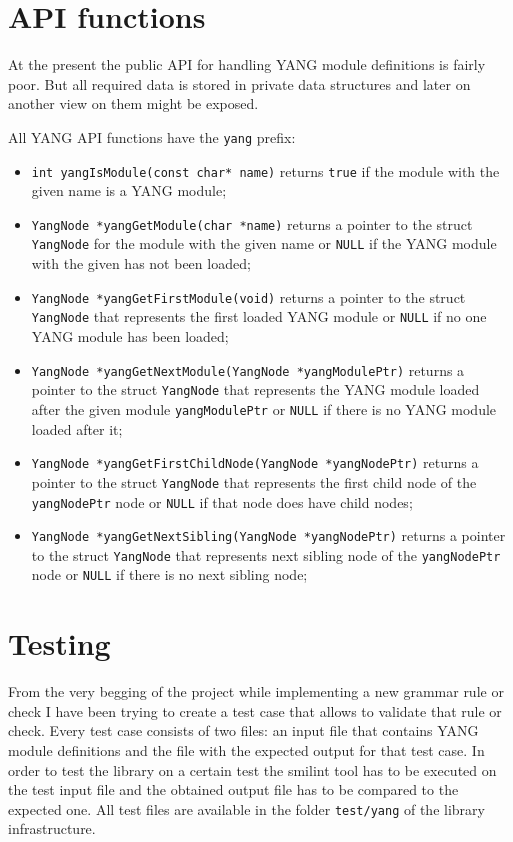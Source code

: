 \documentclass[conference]{IEEEtran}
\begin{document}
\section{API functions}
At the present the public API for handling YANG module definitions is fairly poor. But all required data is stored in private data structures and later on another view on them might be exposed.

All YANG API functions have the \texttt{yang} prefix:
\begin{itemize}
\item \texttt{int yangIsModule(const char* name)} returns \texttt{true} if the module with the given name is a YANG module;
\item \texttt{YangNode *yangGetModule(char *name)} returns a pointer to the struct \texttt{YangNode} for the module with the given name or \texttt{NULL} if the YANG module with the given has not been loaded;
\item \texttt{YangNode *yangGetFirstModule(void)} returns a pointer to the struct \texttt{YangNode} that represents the first loaded YANG module or \texttt{NULL} if no one YANG module has been loaded;
\item \texttt{YangNode *yangGetNextModule(YangNode *yangModulePtr)} returns a pointer to the struct \texttt{YangNode} that represents the YANG module loaded after the given module \texttt{yangModulePtr} or \texttt{NULL} if there is no YANG module loaded after it;
\item \texttt{YangNode *yangGetFirstChildNode(YangNode *yangNodePtr)} returns a pointer to the struct \texttt{YangNode} that represents the first child node of the \texttt{yangNodePtr} node or \texttt{NULL} if that node does have child nodes;
\item \texttt{YangNode *yangGetNextSibling(YangNode *yangNodePtr)} returns a pointer to the struct \texttt{YangNode} that represents next sibling node of the \texttt{yangNodePtr} node or \texttt{NULL} if there is no next sibling node;
\end{itemize}

\section{Testing}
From the very begging of the project  while implementing a new grammar rule or check I have been trying to create a test case that allows to validate that rule or check. Every test case consists of two files: an input file that contains YANG module definitions and the file with the expected output for that test case. In order to test the library on a certain test the smilint tool has to be executed on the test input file and the obtained output file has to be compared to the expected one. All test files are available in the folder 	\texttt{test/yang} of the library infrastructure.
\end{document}
